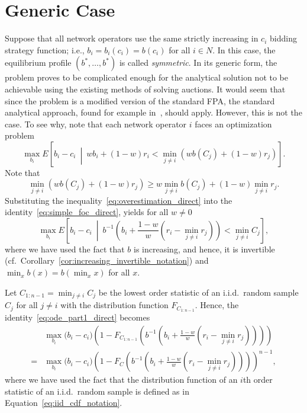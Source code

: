 \section{Generic Case} %
\label{sec:direct_generic_case_direct}
Suppose that all network operators use the same strictly increasing in $c_i$ bidding strategy function; i.e., $b_i = b_i(c_i) = b(c_i)$ for all $i\in N$. In this case, the equilibrium profile $(b^*,\ldots,b^*)$ is called \emph{symmetric}. In its generic form, the problem proves to be complicated enough for the analytical solution not to be achievable using the existing methods of solving auctions. It would seem that since the problem is a modified version of the standard FPA, the standard analytical approach, found for example in~\cite{Krishna10,McAfee1987,Hansen88,Dastidar08}, should apply. However, this is not the case. To see why, note that each network operator $i$ faces an optimization problem
\begin{equation}
	\label{eq:simple_foc_direct}
	\max_{b_i}E\left[ b_i-c_i \:\middle\vert\: wb_i + (1-w)r_i < \displaystyle\min_{j\neq i}(wb(C_j) + (1-w)r_j) \right].
\end{equation}
Note that
\begin{equation}
	\label{eq:overestimation_direct}
	\displaystyle\min_{j\neq i}(wb(C_j) + (1-w)r_j) \ge w\displaystyle\min_{j\neq i}b(C_j) + (1-w)\displaystyle\min_{j\neq i}r_j.
\end{equation}
Substituting the inequality~\eqref{eq:overestimation_direct} into the identity~\eqref{eq:simple_foc_direct}, yields for all $w\neq 0$
\begin{equation}
	\max_{b_i}E\left[ b_i-c_i \:\middle\vert\: b^{-1}\left(b_i + \frac{1-w}{w}(r_i-\displaystyle\min_{j\neq i}r_j)\right) < \displaystyle\min_{j\neq i}C_j \right],
	\label{eq:ode_part1_direct}
\end{equation}
where we have used the fact that $b$ is increasing, and hence, it is invertible (cf.~Corollary~\ref{cor:increasing_invertible_notation}) and $\min_{x}b(x) = b(\min_{x}x)$ for all $x$.

Let $C_{1:n-1} = \min_{j\neq i}C_j$ be the lowest order statistic of an i.i.d.~random sample $C_j$ for all $j\neq i$ with the distribution function $F_{C_{1:n-1}}$. Hence, the identity~\eqref{eq:ode_part1_direct} becomes
\begin{align}
	&\max_{b_i}\bigg(b_i-c_i\bigg)\left(1 - F_{C_{1:n-1}}\left(b^{-1}\left(b_i + \frac{1-w}{w}(r_i-\min_{j\neq i}r_j)\right)\right)\right) \nonumber\\
	= &\max_{b_i}\bigg(b_i-c_i\bigg)\left(1 - F_{C}\left(b^{-1}\left(b_i + \frac{1-w}{w}(r_i-\min_{j\neq i}r_j)\right)\right)\right)^{n-1},
	\label{eq:ode_part2_direct}
\end{align}
where we have used the fact that the distribution function of an $i$th order statistic of an i.i.d.~random sample is defined as in Equation~\eqref{eq:iid_cdf_notation}.

